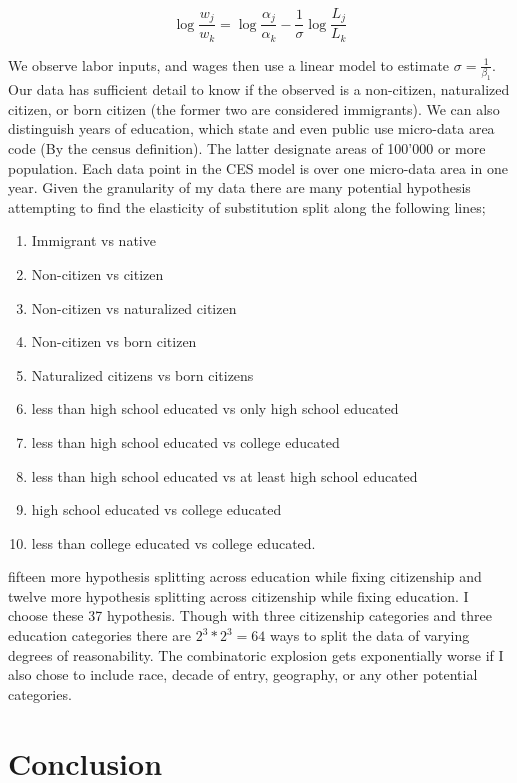 \documentclass[11pt]{article}
\theoremstyle{definition}
\theoremstyle{remark}
\def\a{\alpha}
\def\b{\beta}
\def\s{\sigma}
\begin{document}
\begin{equation}
    \log \frac{w_j}{w_k} = \log\frac{\a_j}{\a_k} - \frac 1\s \log\frac{L_j}{L_k}
\end{equation}

We observe labor inputs, and wages then use a linear model to estimate
$\s = \frac 1{\b_1}$. Our data has sufficient detail to know if the observed
is a non-citizen, naturalized citizen, or born citizen (the former two are
considered immigrants). We can also distinguish years of education, which state
and even public use micro-data area code (By the census definition).
The latter designate areas of 100'000 or more population.
Each data point in the CES model is over one micro-data area in one year.
Given the granularity of my data there are many potential hypothesis attempting
to find the elasticity of
substitution split along the following lines;

\begin{enumerate}
    \item Immigrant vs native
    \item Non-citizen vs citizen
    \item Non-citizen vs naturalized citizen
    \item Non-citizen vs born citizen
    \item Naturalized citizens vs born citizens
    \item less than high school educated vs only high school educated
    \item less than high school educated vs college educated
    \item less than high school educated vs at least high school educated
    \item high school educated vs college educated
    \item less than college educated vs college educated.
\end{enumerate}

fifteen more hypothesis splitting across education while fixing citizenship
and twelve more hypothesis splitting across citizenship while fixing education.
I choose these 37 hypothesis. Though with three citizenship categories and three
education categories there are $2^3 * 2^3 = 64$ ways to split the data
of varying degrees of reasonability. The combinatoric explosion gets exponentially
worse if I also chose to include race, decade of entry, geography, or any other
potential categories.



\section{Conclusion}
\end{document}
